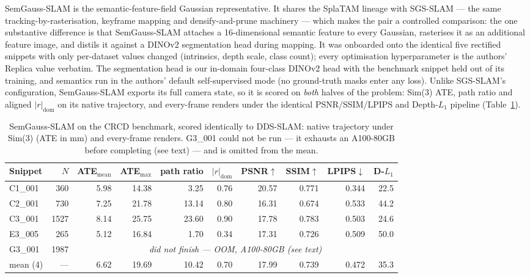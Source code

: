 SemGauss-SLAM \cite{semgauss} is the semantic-feature-field Gaussian
representative. It shares the SplaTAM lineage with SGS-SLAM --- the same
tracking-by-rasterisation, keyframe mapping and densify-and-prune machinery ---
which makes the pair a controlled comparison: the one substantive difference is
that SemGauss-SLAM attaches a 16-dimensional semantic feature to every
Gaussian, rasterises it as an additional feature image, and distils it against
a DINOv2 segmentation head during mapping. It was onboarded onto the identical
five rectified snippets with only per-dataset values changed (intrinsics,
depth scale, class count); every optimisation hyperparameter is the authors'
Replica value verbatim. The segmentation head is our in-domain four-class
DINOv2 head with the benchmark snippet held out of its training, and semantics
run in the authors' default self-supervised mode (no ground-truth masks enter
any loss). Unlike SGS-SLAM's configuration, SemGauss-SLAM exports its full
camera state, so it is scored on \emph{both} halves of the problem: Sim(3) ATE,
path ratio and aligned $|r|_{\mathrm{dom}}$ on its native trajectory, and
every-frame renders under the identical PSNR/SSIM/LPIPS and Depth-$L_1$
pipeline (Table~\ref{tab:bench_semgauss}).

\begin{table}[t]
\centering
\caption{SemGauss-SLAM on the CRCD benchmark, scored identically to DDS-SLAM:
native trajectory under Sim(3) (ATE in mm) and every-frame renders. G3\_001
could not be run --- it exhausts an A100-80GB before completing (see text) ---
and is omitted from the mean.}
\label{tab:bench_semgauss}
\small
\begin{tabular}{l r rrrr rrrr}
\toprule
Snippet & $N$ & ATE$_{\mathrm{mean}}$ & ATE$_{\mathrm{max}}$ & path ratio &
$|r|_{\mathrm{dom}}$ & PSNR$\uparrow$ & SSIM$\uparrow$ & LPIPS$\downarrow$ & D-$L_1$ \\
\midrule
C1\_001 &  360 & 5.98 & 14.38 &  3.25 & 0.76 & 20.57 & 0.771 & 0.344 & 22.5 \\
C2\_001 &  730 & 7.25 & 21.78 & 13.14 & 0.80 & 16.31 & 0.674 & 0.533 & 44.2 \\
C3\_001 & 1527 & 8.14 & 25.75 & 23.60 & 0.90 & 17.78 & 0.783 & 0.503 & 24.6 \\
E3\_005 &  265 & 5.12 & 16.84 &  1.70 & 0.34 & 17.31 & 0.726 & 0.509 & 50.0 \\
G3\_001 & 1987 & \multicolumn{8}{c}{\emph{did not finish --- OOM, A100-80GB (see text)}} \\
\midrule
mean (4) & --- & 6.62 & 19.69 & 10.42 & 0.70 & 17.99 & 0.739 & 0.472 & 35.3 \\
\bottomrule
\end{tabular}
\end{table}

